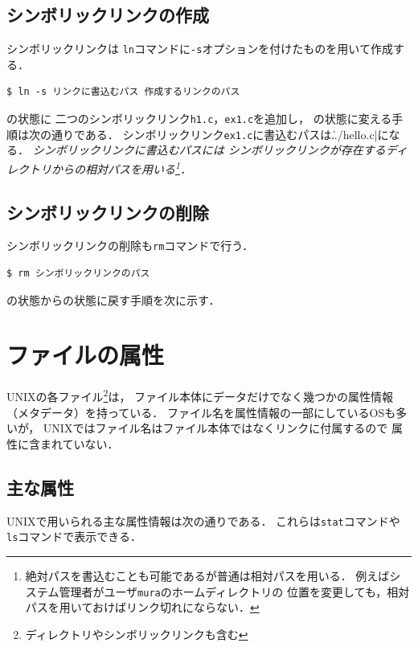 \subsection*{シンボリックリンクの作成}
シンボリックリンクは
\texttt{ln}コマンドに\texttt{-s}オプションを付けたものを用いて作成する．

\begin{lstlisting}[numbers=none]
$ ln -s リンクに書込むパス 作成するリンクのパス
\end{lstlisting}

の状態に
二つのシンボリックリンク\texttt{h1.c}，\texttt{ex1.c}を追加し，
の状態に変える手順は次の通りである．
シンボリックリンク\texttt{ex1.c}に書込むパスは\|../hello.c|になる．
\emph{シンボリックリンクに書込むパスには
シンボリックリンクが存在するディレクトリからの相対パスを用いる\footnote{
絶対パスを書込むことも可能であるが普通は相対パスを用いる．
例えばシステム管理者がユーザ\texttt{mura}のホームディレクトリの
位置を変更しても，相対パスを用いておけばリンク切れにならない．}．}



\subsection*{シンボリックリンクの削除}

シンボリックリンクの削除も\texttt{rm}コマンドで行う．

\begin{lstlisting}[numbers=none]
$ rm シンボリックリンクのパス
\end{lstlisting}

の状態からの状態に戻す手順を次に示す．



\section{ファイルの属性}
UNIXの各ファイル\footnote{ディレクトリやシンボリックリンクも含む}は，
ファイル本体にデータだけでなく幾つかの属性情報（メタデータ）を持っている．
ファイル名を属性情報の一部にしているOSも多いが，
UNIXではファイル名はファイル本体ではなくリンクに付属するので
属性に含まれていない．

\subsection{主な属性}
UNIXで用いられる主な属性情報は次の通りである．
これらは\texttt{stat}コマンドや\texttt{ls}コマンドで表示できる．

